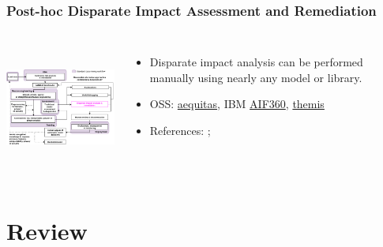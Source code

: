 \documentclass[11pt,
               aspectratio=169,
               hyperref={colorlinks}
               ]{beamer}
\begin{document}
			\begin{frame}		
		
			\frametitle{Post-hoc Disparate Impact Assessment and Remediation}		
			
			\begin{columns}
	
				\centering
				\includegraphics[height=120pt]{img/fair.png}
				
				\vspace{-5pt}
				\begin{itemize}
					\item Disparate impact analysis can be performed manually using nearly any model or library.
					\item OSS: \href{https://github.com/dssg/aequitas}{aequitas}, IBM \href{https://github.com/IBM/AIF360}{AIF360}, \href{https://github.com/LASER-UMASS/Themis}{themis}
					\item References: ;  
				\end{itemize}
				
			\end{columns}
		
		\end{frame}



	\section{Review}
\end{document}
